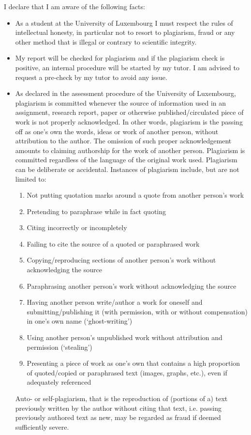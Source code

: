 \documentclass[conference,compsoc]{IEEEtran}
\begin{document}
I declare that I am aware of the following facts:
\begin{itemize}
	\item As a student at the University of Luxembourg I must respect the rules of intellectual honesty, in particular not to resort to plagiarism, fraud or any other method that is illegal or contrary to scientific integrity.
	\item My report will be checked for plagiarism and if the plagiarism check is positive, an internal procedure will be started by my tutor. I am advised to request a pre-check by my tutor to avoid any issue.
	\item As declared in the assessment procedure of the University of Luxembourg, plagiarism is committed whenever the source of information used in an assignment, research report, paper or otherwise published/circulated piece of work is not properly acknowledged. In other words, plagiarism is the passing off as one’s own the words, ideas or work of another person, without attribution to the author. The omission of such proper acknowledgement amounts to claiming authorship for the work of another person. Plagiarism is committed regardless of the language of the original work used. Plagiarism can be deliberate or accidental.
	Instances of plagiarism include, but are not limited to:
	\begin{enumerate}
		\item Not putting quotation marks around a quote from another person’s work
		\item Pretending to paraphrase while in fact quoting
		\item Citing incorrectly or incompletely
		\item Failing to cite the source of a quoted or paraphrased work
		\item Copying/reproducing sections of another person’s work without acknowledging the source
		\item Paraphrasing another person’s work without acknowledging the source
		\item Having another person write/author a work for oneself and submitting/publishing it (with permission, with or without compensation) in one’s own name (‘ghost-writing’)
		\item Using another person’s unpublished work without attribution and permission (‘stealing’)
		\item Presenting a piece of work as one’s own that contains a high proportion of quoted/copied or paraphrased text (images, graphs, etc.), even if adequately referenced
	\end{enumerate}
	Auto- or self-plagiarism, that is the reproduction of (portions of a) text previously written by the author without citing that text, i.e. passing previously authored text as new, may be regarded as fraud if deemed sufficiently severe.
\end{itemize}
\end{document}
